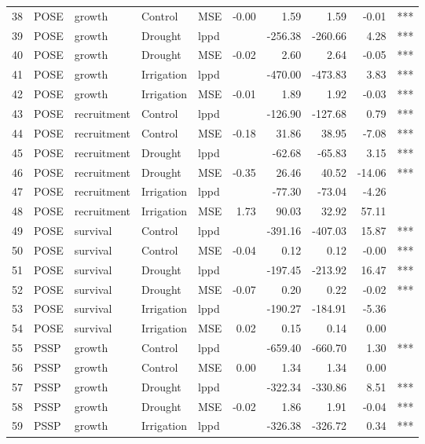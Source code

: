 \begin{longtable}{rllllrrrrl}
  38 & POSE & growth & Control & MSE & -0.00 & 1.59 & 1.59 & -0.01 & *** \\ 
  39 & POSE & growth & Drought & lppd &  & -256.38 & -260.66 & 4.28 & *** \\ 
  40 & POSE & growth & Drought & MSE & -0.02 & 2.60 & 2.64 & -0.05 & *** \\ 
  41 & POSE & growth & Irrigation & lppd &  & -470.00 & -473.83 & 3.83 & *** \\ 
  42 & POSE & growth & Irrigation & MSE & -0.01 & 1.89 & 1.92 & -0.03 & *** \\ 
  43 & POSE & recruitment & Control & lppd &  & -126.90 & -127.68 & 0.79 & *** \\ 
  44 & POSE & recruitment & Control & MSE & -0.18 & 31.86 & 38.95 & -7.08 & *** \\ 
  45 & POSE & recruitment & Drought & lppd &  & -62.68 & -65.83 & 3.15 & *** \\ 
  46 & POSE & recruitment & Drought & MSE & -0.35 & 26.46 & 40.52 & -14.06 & *** \\ 
  47 & POSE & recruitment & Irrigation & lppd &  & -77.30 & -73.04 & -4.26 &  \\ 
  48 & POSE & recruitment & Irrigation & MSE & 1.73 & 90.03 & 32.92 & 57.11 &  \\ 
  49 & POSE & survival & Control & lppd &  & -391.16 & -407.03 & 15.87 & *** \\ 
  50 & POSE & survival & Control & MSE & -0.04 & 0.12 & 0.12 & -0.00 & *** \\ 
  51 & POSE & survival & Drought & lppd &  & -197.45 & -213.92 & 16.47 & *** \\ 
  52 & POSE & survival & Drought & MSE & -0.07 & 0.20 & 0.22 & -0.02 & *** \\ 
  53 & POSE & survival & Irrigation & lppd &  & -190.27 & -184.91 & -5.36 &  \\ 
  54 & POSE & survival & Irrigation & MSE & 0.02 & 0.15 & 0.14 & 0.00 &  \\ 
  55 & PSSP & growth & Control & lppd &  & -659.40 & -660.70 & 1.30 & *** \\ 
  56 & PSSP & growth & Control & MSE & 0.00 & 1.34 & 1.34 & 0.00 &  \\ 
  57 & PSSP & growth & Drought & lppd &  & -322.34 & -330.86 & 8.51 & *** \\ 
  58 & PSSP & growth & Drought & MSE & -0.02 & 1.86 & 1.91 & -0.04 & *** \\ 
  59 & PSSP & growth & Irrigation & lppd &  & -326.38 & -326.72 & 0.34 & *** \\ 

\end{longtable}
